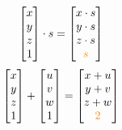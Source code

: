 \documentclass[preview]{standalone}
\begin{document}
$$\begin{bmatrix}x\\y\\z\\1\end{bmatrix}\cdot s = \begin{bmatrix}x\cdot s\\y\cdot s\\z\cdot s\\\textcolor{orange}{s}\end{bmatrix}$$
$$\begin{bmatrix}x\\y\\z\\1\end{bmatrix} + \begin{bmatrix}u\\v\\w\\1\end{bmatrix} = \begin{bmatrix}x+u\\y+v\\z+w\\\textcolor{orange}{2}\end{bmatrix}$$
\end{document}

